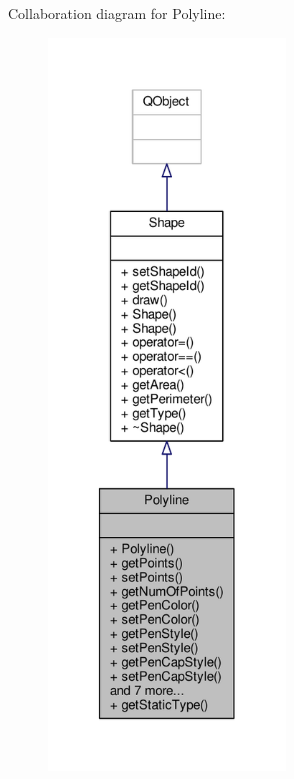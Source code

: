 Collaboration diagram for Polyline\+:\nopagebreak
\begin{figure}[H]
\begin{center}
\leavevmode
\includegraphics[height=550pt]{classPolyline__coll__graph}
\end{center}
\end{figure}
